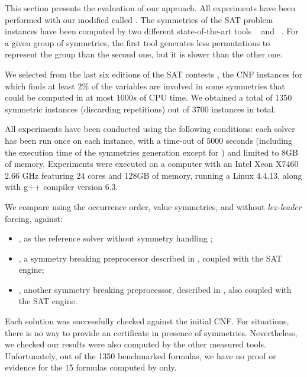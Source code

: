 This section presents the evaluation of our approach. All experiments have been
performed with our modified \minisat{} called \cdclsym{}. The symmetries of the
SAT problem instances have been computed by two different state-of-the-art
tools \saucy{}~\cite{katebi2010symmetry} and
\bliss{}~\cite{JunttilaKaski:ALENEX2007}. For a given group of symmetries, the
first tool generates less permutations to represent the group than the second
one, but it is slower than the other one.

We selected from the last six editions of the SAT contests
\cite{jarvisalo2012international}, the CNF instances for which \bliss{} finds
at least 2\% of the variables are involved in some symmetries that could be
computed in at most $1000s$ of CPU time. We obtained a total of $1350$
symmetric instances (discarding repetitions) out of $3700$ instances in total.

All experiments have been conducted using the following conditions: each solver
has been run once on each instance, with a time-out of 5000 seconds (including
the execution time of the symmetries generation except for \minisat) and limited
to 8GB of memory. Experiments were executed on a computer with an Intel Xeon
X7460 2.66 GHz featuring 24 cores and 128GB of memory, running a Linux 4.4.13,
along with g++ compiler version 6.3.

We compare \cdclsym{} using the occurrence order, value symmetries, and without
\emph{lex-leader} forcing, against:

\begin{itemize}
	
	\item \minisat{}, as the reference solver without symmetry handling
	\cite{een2003extensible};
	
	\item \shatter{}, a symmetry breaking preprocessor described in \cite{aloul06},
	coupled with the \minisat{} SAT engine;
	
	\item \breakid{}, another symmetry breaking preprocessor, described in
	\cite{Devriendt16}, also coupled with the \minisat{} SAT engine.
	
\end{itemize}

Each \sat solution was successfully checked against the initial CNF. For \unsat
situations, there is no way to provide an \unsat certificate in presence of
symmetries. Nevertheless, we checked our results were also computed by the
other measured tools. Unfortunately, out of the 1350 benchmarked formulas, we
have no proof or evidence for the 15 \unsat formulas computed by \cdclsym{}
only.

